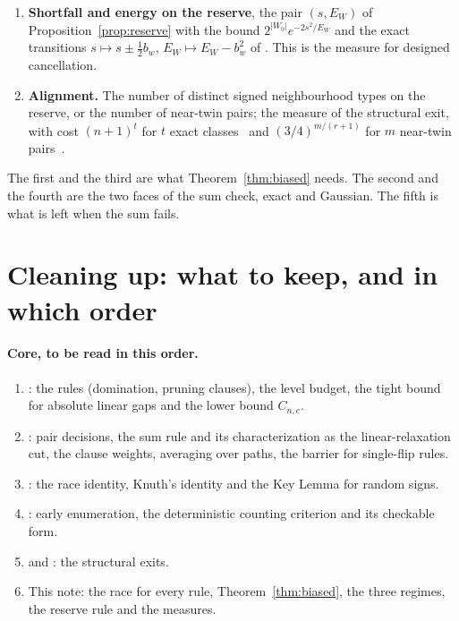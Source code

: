 \documentclass[11pt,a4paper]{article}
\theoremstyle{definition}
\theoremstyle{remark}
\begin{document}
\begin{enumerate}
 expectation and is spent, $|\Delta_t|$ at a time, when variables are
 branched.
 \item \textbf{Shortfall and energy on the reserve}, the pair $(s,E_W)$ of
 Proposition~\ref{prop:reserve} with the bound $2^{|W_0|}e^{-2s^2/E_W}$ and the
 exact transitions $s\mapsto s\pm\frac12b_w$, $E_W\mapsto E_W-b_w^2$ of
 \cite[Section~7]{CC}. This is the measure for designed cancellation.
 \item \textbf{Alignment.} The number of distinct signed neighbourhood types
 on the reserve, or the number of near-twin pairs; the measure of the
 structural exit, with cost $(n+1)^t$ for $t$ exact classes~\cite{N5} and
 $(3/4)^{m/(r+1)}$ for $m$ near-twin pairs~\cite{NT}.
\end{enumerate}

The first and the third are what Theorem~\ref{thm:biased} needs. The second
and the fourth are the two faces of the sum check, exact and Gaussian. The
fifth is what is left when the sum fails.

\section{Cleaning up: what to keep, and in which order}\label{sec:cleanup}

\paragraph{Core, to be read in this order.}
\begin{enumerate}
 \item \cite{N3}: the rules (domination, pruning clauses), the level budget,
 the tight bound for absolute linear gaps and the lower bound $C_{n,c}$.
 \item \cite{N4}: pair decisions, the sum rule and its characterization as
 the linear-relaxation cut, the clause weights, averaging over paths, the
 barrier for single-flip rules.
 \item \cite{N7,N8}: the race identity, Knuth's identity and the Key Lemma
 for random signs.
 \item \cite{EE,CC,CA}: early enumeration, the deterministic counting
 criterion and its checkable form.
 \item \cite{NT} and \cite[Section~5]{N5}: the structural exits.
 \item This note: the race for every rule, Theorem~\ref{thm:biased}, the
 three regimes, the reserve rule and the measures.
\end{enumerate}
\end{document}
